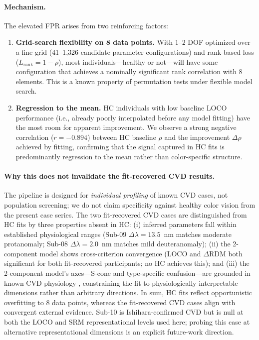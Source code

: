 \documentclass{article}
\begin{document}
\paragraph{Mechanism.}
The elevated FPR arises from two reinforcing factors:
\begin{enumerate}
\item \textbf{Grid-search flexibility on 8 data points.} With 1--2 DOF optimized over a fine grid (41--1,326 candidate parameter configurations) and rank-based loss ($L_{\text{rank}} = 1 - \rho$), most individuals---healthy or not---will have some configuration that achieves a nominally significant rank correlation with 8 elements. This is a known property of permutation tests under flexible model search.
\item \textbf{Regression to the mean.} HC individuals with low baseline LOCO performance (i.e., already poorly interpolated before any model fitting) have the most room for apparent improvement. We observe a strong negative correlation ($r = -0.894$) between HC baseline $\rho$ and the improvement $\Delta\rho$ achieved by fitting, confirming that the signal captured in HC fits is predominantly regression to the mean rather than color-specific structure.
\end{enumerate}

\paragraph{Why this does not invalidate the fit-recovered CVD results.}
The pipeline is designed for \emph{individual profiling} of known CVD cases, not population screening; we do not claim specificity against healthy color vision from the present case series.
The two fit-recovered CVD cases are distinguished from HC fits by three properties absent in HC:
(i) inferred parameters fall within established physiological ranges (Sub-09 $\Delta\lambda = 13.5$~nm matches moderate protanomaly; Sub-08 $\Delta\lambda = 2.0$~nm matches mild deuteranomaly);
(ii) the 2-component model shows cross-criterion convergence (LOCO and $\Delta$RDM both significant for both fit-recovered participants; no HC achieves this); and
(iii) the 2-component model's axes---S-cone and type-specific confusion---are grounded in known CVD physiology \citep{emery2021}, constraining the fit to physiologically interpretable dimensions rather than arbitrary directions.
In sum, HC fits reflect opportunistic overfitting to 8 data points, whereas the fit-recovered CVD cases align with convergent external evidence.
Sub-10 is Ishihara-confirmed CVD but is null at both the LOCO and SRM representational levels used here; probing this case at alternative representational dimensions is an explicit future-work direction.
\end{document}
